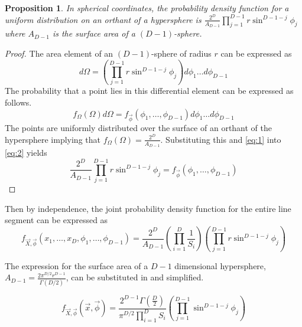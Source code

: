 \documentclass{article}
\newtheorem{proposition}{Proposition}
\begin{document}
\begin{proposition}
In spherical coordinates, the probability density function for a uniform distribution on an orthant of a hypersphere is $\frac{2^D}{A_{D-1}}\prod_{j=1}^{D-1}r\sin^{D-1-j}\phi_j$ where
$A_{D-1}$ is the surface area of a $(D-1)$-sphere.
\end{proposition}
\begin{proof}
	The area element of an $(D-1)$-sphere of radius $r$ can be expressed as 
	\begin{equation} \label{eq:1}
	d\Omega = \left(\prod_{j=1}^{D-1}r\sin^{D-1-j}\phi_j\right)d\phi_1 \hdots d\phi_{D-1}
	\end{equation}
	The probability that a point lies in this differential element can be expressed as follows.
	\begin{equation} \label{eq:2}
	f_{\Omega}(\Omega)d\Omega = f_{\vec{\phi}}(\phi_1, \hdots, \phi_{D-1})d\phi_1 \hdots d\phi_{D-1}
	\end{equation}
	The points are uniformly distributed over the surface of an orthant of the hypersphere implying that $f_{\Omega}(\Omega) = \frac{2^D}{A_{D-1}}$. Substituting this and
	\ref{eq:1} into \ref{eq:2} yields
	\begin{equation}
	\frac{2^D}{A_{D-1}}\prod_{j=1}^{D-1}r\sin^{D-1-j}\phi_j = f_{\vec{\phi}}(\phi_1, \hdots, \phi_{D-1})
	\end{equation}
\end{proof}

Then by independence, the joint probability density function for the entire line segment can be expressed as 
\begin{equation} 
	f_{\vec{X},\vec{\phi}}(x_1, \hdots, x_D, \phi_1, \hdots, \phi_{D-1}) = \frac{2^D}{A_{D-1}}\left(\prod_{i=1}^D\frac{1}{S_i}\right)\left(\prod_{j=1}^{D-1}r\sin^{D-1-j}\phi_j\right)
\end{equation} 

The expression for the surface area of a $D-1$ dimensional hypersphere, $A_{D-1}=\frac{2\pi^{D/2}r^{D-1}}{\Gamma(D/2)}$,
can be substituted in and simplified.

\begin{equation}\label{eq:general pdf}
	f_{\vec{X},\vec{\phi}}(\vec{x}, \vec{\phi}) = \frac{2^{D-1}\Gamma(\frac{D}{2})}{\pi^{D/2}\prod_{i=1}^DS_i} \left(\prod_{j=1}^{D-1}\sin^{D-1-j}\phi_j\right)
\end{equation}
\end{document}
